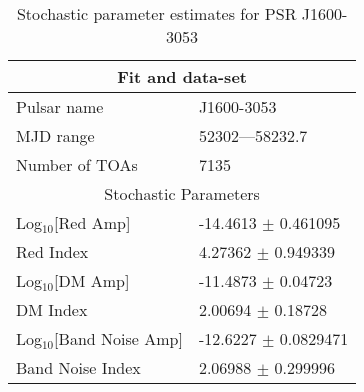 \documentclass{article}
\begin{document}
\begin{table*}
\caption{Stochastic parameter estimates for PSR J1600-3053}
\begin{tabular}{ll}
\hline\hline
\multicolumn{2}{c}{Fit and data-set} \\ 
\hline
Pulsar name\dotfill & J1600-3053 \\ 
MJD range\dotfill & 52302---58232.7 \\ 
Number of TOAs\dotfill & 7135 \\
\hline
\multicolumn{2}{c}{Stochastic Parameters} \\ 
\hline
Log$_{10}$[Red Amp] \dotfill & -14.4613 $\pm$ 0.461095  \\ 
Red Index \dotfill & 4.27362 $\pm$ 0.949339  \\ 
Log$_{10}$[DM Amp] \dotfill & -11.4873 $\pm$ 0.04723  \\ 
DM Index \dotfill & 2.00694 $\pm$ 0.18728  \\ 
Log$_{10}$[Band Noise Amp] \dotfill & -12.6227 $\pm$ 0.0829471  \\ 
Band Noise Index \dotfill & 2.06988 $\pm$ 0.299996  \\ 
\hline
\end{tabular}
\label{Table:J1600-3053}
\end{table*} 
\end{document}
